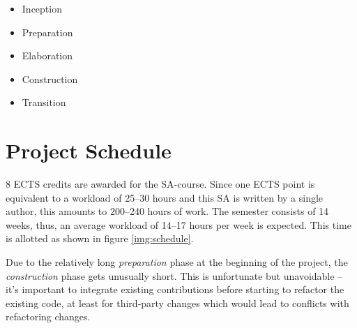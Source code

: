 \begin{itemize}[parsep=5pt]
  \item Inception
  \item Preparation
  \item Elaboration
  \item Construction
  \item Transition
\end{itemize}

\section{Project Schedule}
\label{schedule}

8 ECTS credits are awarded for the SA-course. Since one ECTS point is equivalent
to a workload of 25--30 hours \autocite{ects} and this SA is written by a single
author, this amounts to 200--240 hours of work. The semester consists of 14
weeks, thus, an average workload of 14--17 hours per week is expected. This time
is allotted as shown in figure \ref{img:schedule}.

Due to the relatively long \emph{preparation} phase at the beginning of the
project, the \emph{construction} phase gets unusually short. This is
unfortunate but unavoidable -- it's important to integrate existing
contributions before starting to refactor the existing code, at least for
third-party changes which would lead to conflicts with refactoring changes.

